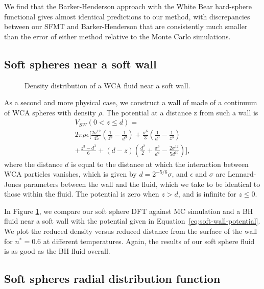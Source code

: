 \documentclass[letterpaper,twocolumn,amsmath,amssymb,prb]{revtex4-1}
\begin{document}
We find that the Barker-Henderson approach with the White Bear
hard-sphere functional gives almost identical predictions to our
method, with discrepancies between our SFMT and Barker-Henderson that
are consistently much smaller than the error of either method relative
to the Monte Carlo simulations.

\subsection{Soft spheres near a soft wall}

\begin{figure}
  \begin{center}
  \caption{Density distribution of a WCA fluid near a soft wall.}
  \label{fig:soft-walls}
  \end{center}
\end{figure}

As a second and more physical case, we construct a wall of made of a
continuum of WCA spheres with density $\rho$.  The potential
at a distance z from such a wall is
\begin{multline}
  V_{SW}(0 < z \leq d) = \\
  2\pi\rho\epsilon\Big[
  \frac{2\sigma^{12}}{45} \left(\frac{1}{z^9}-\frac{1}{d^9}\right)
  +\frac{\sigma^6}{3}\left(\frac{1}{d^3}-\frac{1}{z^3}
  \right) \\
  + \frac{z^3-d^3}{6} + \left( d - z \right)\left(\frac{d^2}{2} +
  \frac{\sigma^6}{d^4} - \frac{2\sigma^{12}}{5d^{10}}\right)
  \Bigg],
\label{eq:soft-wall-potential}
\end{multline}
where the distance $d$ is equal to the distance at which the
interaction between WCA particles vanishes, which is given by $d =
2^{-5/6}\sigma$, and $\epsilon$ and $\sigma$ are Lennard-Jones
parameters between the wall and the fluid, which we take to be
identical to those within the fluid. The potential is zero when $z>d$,
and is infinite for $z\leq 0$.

In Figure \ref{fig:soft-walls}, we compare our soft sphere DFT
against MC simulation and a BH fluid near a soft wall
with the potential given in Equation~\ref{eq:soft-wall-potential}. We
plot the reduced density versus reduced distance from the surface of
the wall for $n^*=0.6$ at different temperatures. Again, the results
of our soft sphere fluid is as good as the BH fluid
overall.

\subsection{Soft spheres radial distribution function}
\end{document}
